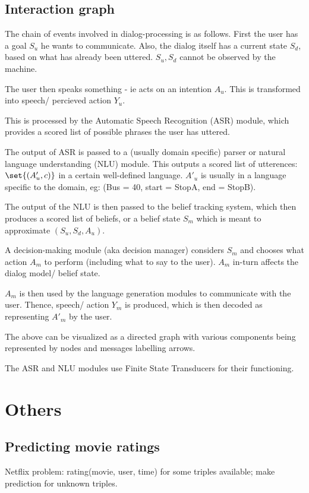 \documentclass[oneside, article]{memoir}
\begin{document}
\section{Interaction graph}
The chain of events involved in dialog-processing is as follows. First the user has a goal $S_u$ he wants to communicate. Also, the dialog itself has a current state $S_d$, based on what has already been uttered. $S_u, S_d$ cannot be observed by the machine.

The user then speaks something - ie acts on an intention $A_u$. This is transformed into speech/ percieved action $Y_u$.

This is processed by the Automatic Speech Recognition (ASR) module, which provides a scored list of possible phrases the user has uttered.

The output of ASR is passed to a (usually domain specific) parser or natural language understanding (NLU) module. This outputs a scored list of utterences: $\set{(A'_u, c)}$ in a certain well-defined language. $A'_u$ is usually in a language specific to the domain, eg: (Bus = 40, start = StopA, end = StopB).

The output of the NLU is then passed to the belief tracking system, which then produces a scored list of beliefs, or a belief state $S_m$ which is meant to approximate $(S_u, S_d, A_u)$.

A decision-making module (aka decision manager) considers $S_m$ and chooses what action $A_m$ to perform (including what to say to the user). $A_m$ in-turn affects the dialog model/ belief state.

$A_m$ is then used by the language generation modules to communicate with the user. Thence, speech/ action $Y_m$ is produced, which is then decoded as representing $A'_m$ by the user.

The above can be visualized as a directed graph with various components being represented by nodes and messages labelling arrows.

The ASR and NLU modules use Finite State Transducers for their functioning.

\chapter{Others}
\section{Predicting movie ratings}
Netflix problem: rating(movie, user, time) for some triples available; make prediction for unknown triples. 
\end{document}
